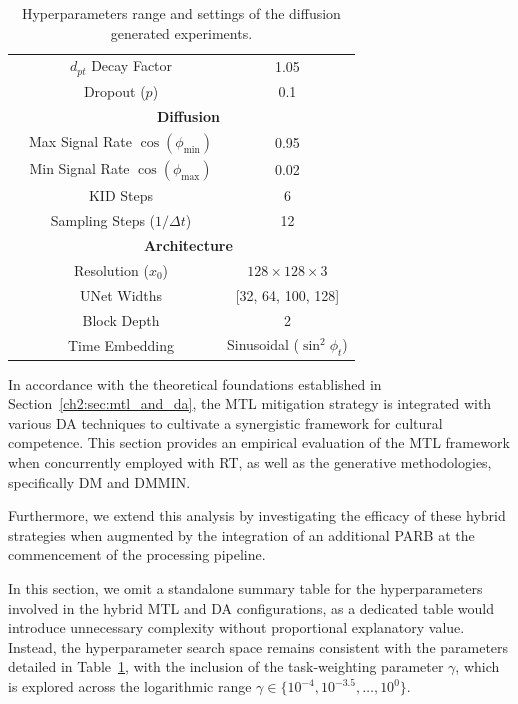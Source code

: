 \begin{table}
\begin{tabular}{c|c|c}
 \hhline{~--}
& $d_{pt}$ Decay Factor & 1.05 \\
\hhline{~--}
& Dropout ($p$) & 0.1 \\
\hhline{~--}
& \multicolumn{2}{c}{\textbf{Diffusion}}\\
\hhline{~--}
 & Max Signal Rate $\cos(\phi_{\min})$ & 0.95 \\ 
\hhline{~--}
 & Min Signal Rate $\cos(\phi_{\max})$ & 0.02 \\ 
\hhline{~--}
 & KID Steps & 6 \\ 
\hhline{~--}
 & Sampling Steps ($1/\Delta t$) & 12 \\ 
\hhline{~--}
& \multicolumn{2}{c}{\textbf{Architecture}}\\
\hhline{~--}
 & Resolution ($x_0$) & $128 \times 128 \times 3$ \\ 
\hhline{~--}
 & UNet Widths & [32, 64, 100, 128] \\
\hhline{~--}
 & Block Depth & 2 \\ 
\hhline{~--}
 & Time Embedding & Sinusoidal ($\sin^2\phi_t$) \\ 
\bottomrule
\end{tabular}
\caption{Hyperparameters range and settings of the diffusion generated experiments.}
\label{ch3:tab:hyper:diff}
\end{table}
%



In accordance with the theoretical foundations established in Section~\ref{ch2:sec:mtl_and_da}, the MTL mitigation strategy is integrated with various DA techniques to cultivate a synergistic framework for cultural competence. 
This section provides an empirical evaluation of the MTL framework when concurrently employed with RT, as well as the generative methodologies, specifically DM and DMMIN.

Furthermore, we extend this analysis by investigating the efficacy of these hybrid strategies when augmented by the integration of an additional PARB at the commencement of the processing pipeline. 

In this section, we omit a standalone summary table for the hyperparameters involved in the hybrid MTL and DA configurations, as a dedicated table would introduce unnecessary complexity without proportional explanatory value. 
Instead, the hyperparameter search space remains consistent with the parameters detailed in Table~\ref{ch3:tab:hyper:diff}, with the inclusion of the task-weighting parameter $\gamma$, which is explored across the logarithmic range $\gamma \in \{10^{-4}, 10^{-3.5}, \dots, 10^{0}\}$.

